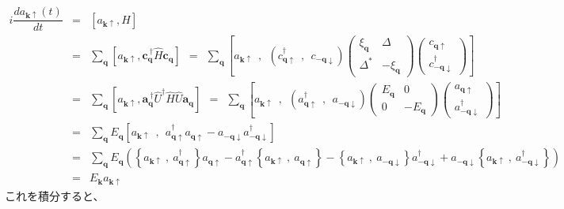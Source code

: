 \documentclass[uplatex,a4j,12pt,dvipdfmx]{jsarticle}
\begin{document}
\begin{eqnarray}
	i \dfrac{d a_{\bm{k}\uparrow}(t)}{dt}
	&=&
	\left[ a_{\bm{k}\uparrow} , H \right]
	\nonumber \\[2mm] &=&
	\sum_{\bm{q}}
	\left[ a_{\bm{k}\uparrow} , \bm{c}_{\bm{q}}^{\ \dagger} \hat{H} \bm{c}_{\bm{q}} \right]
	\ \ = \ \
	\sum_{\bm{q}}
	\left[ a_{\bm{k}\uparrow} \ \ , \ \ \left( c_{\bm{q} \uparrow}^{\dagger} \ \ , \ \ c_{-\bm{q} \downarrow} \right)
		\!\!\!
		\left(
		\begin{array}{cc}
				\xi_{\bm{q}} & \Delta
				\\[3mm]
				\Delta^{*}    & - \xi_{\bm{q}}
			\end{array}
		\right)
		\!\!\!
		\left(
		\!\!
		\begin{array}{c}
				c_{\bm{q} \uparrow}
				\\[3mm]
				c_{-\bm{q} \downarrow}^{\dagger}
			\end{array}
		\!\!
		\right)
		\right]
	\nonumber \\[2mm] &=&
	\sum_{\bm{q}}
	\left[ a_{\bm{k}\uparrow} , \bm{a}_{\bm{q}}^{\ \dagger} \hat{U}^{\dagger} \hat{H} \hat{U} \bm{a}_{\bm{q}} \right]
	\ \ = \ \
	\sum_{\bm{q}}
	\left[ a_{\bm{k}\uparrow} \ \ , \ \ \left( a_{\bm{q} \uparrow}^{\dagger} \ \ , \ \ a_{-\bm{q} \downarrow} \right)
		\!\!\!
		\left(
		\begin{array}{cc}
				E_{\bm{q}} & 0
				\\[3mm]
				0           & - E_{\bm{q}}
			\end{array}
		\right)
		\!\!\!
		\left(
		\!\!
		\begin{array}{c}
				a_{\bm{q} \uparrow}
				\\[3mm]
				a_{-\bm{q} \downarrow}^{\dagger}
			\end{array}
		\!\!
		\right)
		\right]
	\nonumber \\[2mm] &=&
	\sum_{\bm{q}}
	E_{\bm{q}}
	\left[
		a_{\bm{k}\uparrow}
		\ \ , \ \
		a_{\bm{q} \uparrow}^{\dagger} a_{\bm{q} \uparrow} - a_{-\bm{q} \downarrow} a_{-\bm{q} \downarrow}^{\dagger}
		\right]
	\nonumber \\[2mm] &=&
	\sum_{\bm{q}}
	E_{\bm{q}}
	\left(
	\left\{ a_{\bm{k}\uparrow} \ , \ a_{\bm{q} \uparrow}^{\dagger} \right\} a_{\bm{q} \uparrow}
	-
	a_{\bm{q} \uparrow}^{\dagger} \left\{ a_{\bm{k}\uparrow} \ , \ a_{\bm{q} \uparrow} \right\}
	-
	\left\{ a_{\bm{k}\uparrow} \ , \ a_{-\bm{q} \downarrow} \right\} a_{-\bm{q} \downarrow}^{\dagger}
	+
	a_{-\bm{q} \downarrow}  \left\{ a_{\bm{k}\uparrow} \ , \ a_{-\bm{q} \downarrow}^{\dagger} \right\}
	\right)
	\nonumber \\[2mm] &=&
	E_{\bm{k}}
	a_{\bm{k} \uparrow}
\end{eqnarray}
%
これを積分すると、
\end{document}
